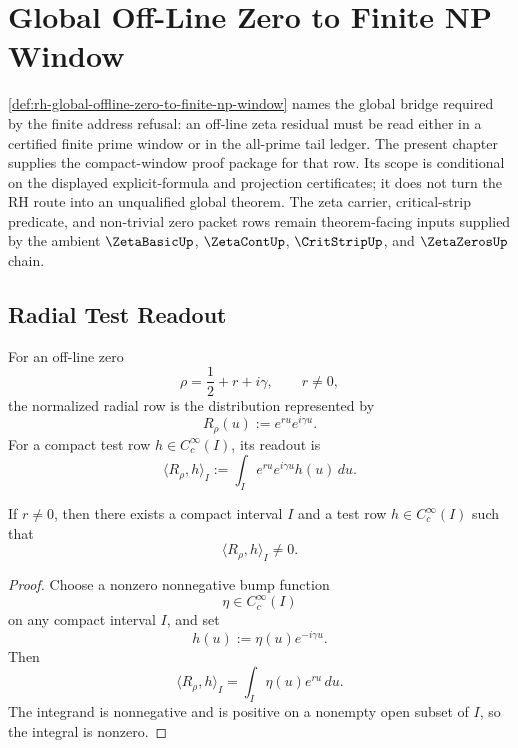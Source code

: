 \chapter{Global Off-Line Zero to Finite NP Window}
\label{ch:visions-rh-global-offline-zero-finite-np-window}

\autoref{def:rh-global-offline-zero-to-finite-np-window} names the
global bridge required by the finite address refusal: an off-line
zeta residual must be read either in a certified finite prime window or
in the all-prime tail ledger.  The present chapter supplies the
compact-window proof package for that row.  Its scope is conditional on
the displayed explicit-formula and projection certificates; it does not
turn the RH route into an unqualified global theorem.  The zeta carrier,
critical-strip predicate, and non-trivial zero packet rows remain
theorem-facing inputs supplied by the ambient $\ZetaBasicUp$,
$\ZetaContUp$, $\CritStripUp$, and $\ZetaZerosUp$ chain.

\section{Radial Test Readout}
\label{sec:rh-global-window-radial-test-readout}

\begin{definition}
\label{def:rh-offline-radial-distribution-row}
For an off-line zero
$$
\rho=\frac12+r+i\gamma,
\qquad
r\ne0,
$$
the normalized radial row is the distribution represented by
$$
R_\rho(u):=e^{ru}e^{i\gamma u}.
$$
For a compact test row $h\in C_c^\infty(I)$, its readout is
$$
\langle R_\rho,h\rangle_I
:=
\int_I e^{ru}e^{i\gamma u}h(u)\,du.
$$
\end{definition}

\begin{lemma}
\label{lem:rh-nonzero-radial-mode-compact-test-readout}
If $r\ne0$, then there exists a compact interval $I$ and a test row
$h\in C_c^\infty(I)$ such that
$$
\langle R_\rho,h\rangle_I\ne0.
$$
\end{lemma}

\begin{proof}
Choose a nonzero nonnegative bump function
$$
\eta\in C_c^\infty(I)
$$
on any compact interval $I$, and set
$$
h(u):=\eta(u)e^{-i\gamma u}.
$$
Then
$$
\langle R_\rho,h\rangle_I
=
\int_I \eta(u)e^{ru}\,du.
$$
The integrand is nonnegative and is positive on a nonempty open subset
of $I$, so the integral is nonzero.
\end{proof}


